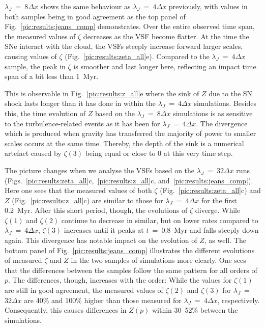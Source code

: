 $\lambda_J$~=~$8\Delta{}x$ shows the same behaviour as $\lambda_J$~=~$4\Delta{}x$ previously, with values in both samples being in good agreement as the top panel of Fig.~\ref{pic:results:jeans_comp} demonstrates. 
Over the entire observed time span, the measured values of $\zeta$ decreases as the VSF become flatter.
At the time the SNe interact with the cloud, the VSFs steeply increase forward larger scales, causing values of $\zeta$ (Fig.~\ref{pic:results:zeta_all}e).
Compared to the $\lambda_J$~=~$4\Delta{}x$ sample, the peak in $\zeta$ is smoother and last longer here, reflecting an impact time span of a bit less than 1~Myr.

This is observable in Fig.~\ref{pic:results:z_all}e where the sink of $Z$ due to the SN shock lasts longer than it has done in within the $\lambda_J$~=~$4\Delta{}x$ simulations. 
Besides this, the time evolution of $Z$ based on the $\lambda_J$~=~$8\Delta{}x$ simulations is as sensitive to the turbulence-related events as it has been for $\lambda_J$~=~$4\Delta{}x$.
The divergence which is produced when gravity has transferred the majority of power to smaller scales occurs at the same time. 
Thereby, the depth of the sink is a numerical artefact caused by $\zeta(3)$ being equal or close to 0 at this very time step. 

The picture changes when we analyse the VSFs based on the $\lambda_J$~=~$32\Delta{}x$ runs (Figs.~\ref{pic:results:zeta_all}c,~\ref{pic:results:z_all}c, and~\ref{pic:results:jeans_comp}).
Here one sees that the measured values of both $\zeta$ (Fig.~\ref{pic:results:zeta_all}c) and $Z$ (Fig.~\ref{pic:results:z_all}c) are similar to those for $\lambda_J$~=~$4\Delta{}x$ for the first 0.2~Myr.
After this short period, though, the evolutions of $\zeta$ diverge. 
While $\zeta(1)$ and $\zeta(2)$ continue to decrease in similar, but on lower rates compared to $\lambda_J$~=~$4\Delta{}x$, $\zeta(3)$ increases until it peaks at $t$~=~0.8~Myr and falls steeply down again.
This divergence has notable impact on the evolution of $Z$, as well. 
The bottom panel of Fig.~\ref{pic:results:jeans_comp} illustrates the different evolutions of measured $\zeta$ and $Z$ in the two samples of simulations more clearly.
One sees that the differences between the samples follow the same pattern for all orders of $p$.
The differences, though, increases with the order:
While the values for $\zeta(1)$ are still in good agreement, the measured values of $\zeta(2)$ and $\zeta(3)$ for $\lambda_J$~=~$32\Delta{}x$ are 40\% and 100\% higher than those measured for $\lambda_J$~=~$4\Delta{}x$, respectively.
Consequently, this causes differences in $Z(p)$ within 30--52\% between the simulations.

